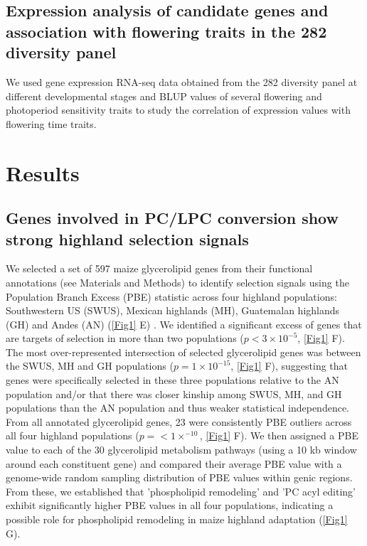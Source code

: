 \subsection{Expression analysis of candidate genes and association with flowering traits in the 282 diversity panel}
We used gene expression RNA-seq data obtained from the 282 diversity panel at different developmental stages \citep{kremling2018-gn} and BLUP values of several flowering and photoperiod sensitivity traits \citep{hung2012-ms} to study the correlation of \hpc expression values with flowering time traits.  


\section{Results}

\subsection{Genes involved in PC/LPC conversion show strong highland selection signals} 
We selected a set of 597 maize glycerolipid genes from their functional annotations (see Materials and Methods) to identify selection signals using the Population Branch Excess (PBE) \citep{pool2017-oa} statistic across four highland populations: Southwestern US (SWUS), Mexican highlands (MH), Guatemalan highlands (GH) and Andes (AN) (\autoref{Fig1} E) \citep{wang2020-mp}. 
We identified a significant excess of genes that are targets of selection in more than two populations ($ p< 3 \times 10^{-5}$, \ref{Fig1} F).
The most over-represented intersection of selected glycerolipid genes was between the SWUS, MH and GH populations ($p = 1  \times 10 ^{-15} $, \autoref{Fig1} F), suggesting that genes were specifically selected in these three populations relative to the AN population and/or that there was closer kinship among SWUS, MH, and GH populations than the AN population and thus weaker statistical independence.
From all annotated glycerolipid genes, 23 were consistently PBE outliers across all four highland populations ($p =<1  \times  ^{-10}$, \autoref{Fig1} F).
We then assigned a PBE value to each of the 30 glycerolipid metabolism pathways (using a 10 kb window around each constituent gene)  and compared their average PBE value with a genome-wide random sampling distribution of PBE values within genic regions. 
From these, we established that 'phospholipid remodeling' and 'PC acyl editing' exhibit significantly higher PBE values in all four populations, indicating a possible role for phospholipid remodeling in maize highland adaptation
(\autoref{Fig1} G). 


